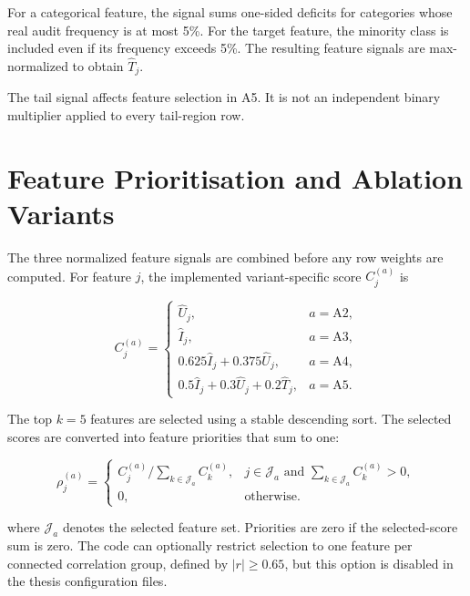 For a categorical feature, the signal sums one-sided deficits for categories
whose real audit frequency is at most 5\%. For the target feature, the minority
class is included even if its frequency exceeds 5\%. The resulting feature
signals are max-normalized to obtain $\widehat{T}_j$.

The tail signal affects feature selection in A5. It is not an independent
binary multiplier applied to every tail-region row.

\section{Feature Prioritisation and Ablation Variants}
\label{sec:feature_prioritisation}

The three normalized feature signals are combined before any row weights are
computed. For feature $j$, the implemented variant-specific score $C_j^{(a)}$
is

\begin{equation}
    C_j^{(a)} =
    \begin{cases}
        \widehat{U}_j, & a=\mathrm{A2},\\
        \widehat{I}_j, & a=\mathrm{A3},\\
        0.625\widehat{I}_j+0.375\widehat{U}_j, & a=\mathrm{A4},\\
        0.5\widehat{I}_j+0.3\widehat{U}_j+0.2\widehat{T}_j,
            & a=\mathrm{A5}.
    \end{cases}
    \label{eq:variant_feature_score}
\end{equation}

The top $k=5$ features are selected using a stable descending sort. The
selected scores are converted into feature priorities that sum to one:

\begin{equation}
    \rho_j^{(a)} =
    \begin{cases}
        C_j^{(a)}/\sum_{k\in\mathcal{J}_a}C_k^{(a)},
        & j\in\mathcal{J}_a \text{ and }\sum_{k\in\mathcal{J}_a}C_k^{(a)}>0,\\
        0, & \text{otherwise}.
    \end{cases}
    \label{eq:feature_priority}
\end{equation}

where $\mathcal{J}_a$ denotes the selected feature set. Priorities are zero if
the selected-score sum is zero. The code can optionally restrict selection to
one feature per connected correlation group, defined by
$|r|\ge 0.65$, but this option is disabled in the thesis configuration files.

